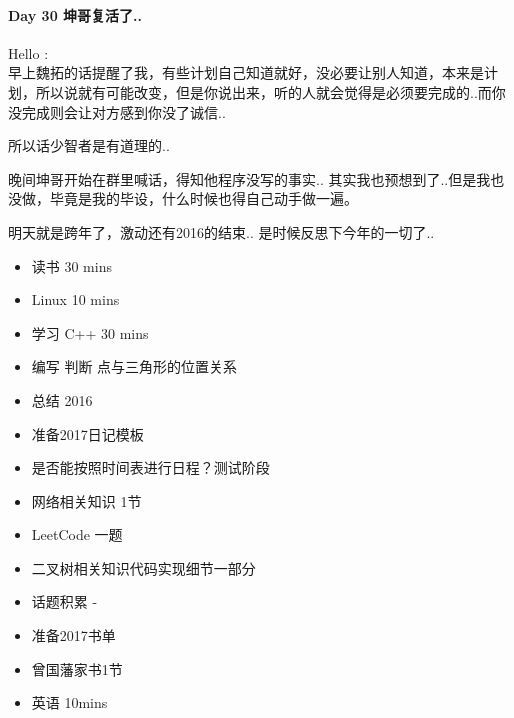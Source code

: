 \documentclass[UTF8,a4paper,8pt]{ctexbook}
\begin{document}
 	 \paragraph{Day 30   坤哥复活了..   \quad     }
	 	 Hello :\\
	 	  早上魏拓的话提醒了我，有些计划自己知道就好，没必要让别人知道，本来是计划，所以说就有可能改变，但是你说出来，听的人就会觉得是必须要完成的..而你没完成则会让对方感到你没了诚信..
	 	  
	 	  所以话少智者是有道理的..
	 	  
	 	  晚间坤哥开始在群里喊话，得知他程序没写的事实..	其实我也预想到了..但是我也没做，毕竟是我的毕设，什么时候也得自己动手做一遍。
	 	  
	 	  明天就是跨年了，激动还有2016的结束.. 是时候反思下今年的一切了..
	 	  
	 	  \begin{itemize}
	 	  	\item \makebox[0pt][l]{$\square$}\raisebox{.15ex}{\hspace{0.1em}$\checkmark$}读书       30 mins	
	 	  	\item \makebox[0pt][l]{$\square$}\raisebox{.15ex}{\hspace{0.1em}$\checkmark$}Linux      10 mins	  
	 	  	\item 学习  C++  30 mins 
	 	  	\item 编写 判断 点与三角形的位置关系
	 	  	\item 总结 2016
	 	  	\item \makebox[0pt][l]{$\square$}\raisebox{.15ex}{\hspace{0.1em}$\checkmark$}准备2017日记模板
	 	  	\item \makebox[0pt][l]{$\square$}\raisebox{.15ex}{\hspace{0.1em}$\checkmark$}是否能按照时间表进行日程？测试阶段
	 	  	
	 	  	\item  网络相关知识 1节
	 	  	\item  LeetCode    一题
	 	  	\item  二叉树相关知识代码实现细节一部分 
	 	  	
	 	  	\item  \makebox[0pt][l]{$\square$}\raisebox{.15ex}{\hspace{0.1em}$\checkmark$}话题积累 	-
	 	  	\item  \makebox[0pt][l]{$\square$}\raisebox{.15ex}{\hspace{0.1em}$\checkmark$}准备2017书单
	 	  	\item  曾国藩家书1节
	 	  	\item  英语 10mins
	 	  \end{itemize}  
\end{document}

